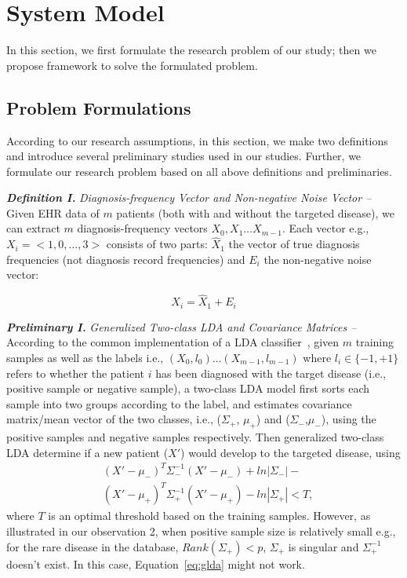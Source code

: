 \section{\TheName{} System Model}\label{sec:3}
In this section, we first formulate the research problem of our study; then we propose \TheName{} framework to solve the formulated problem.

\subsection{Problem Formulations}

According to our research assumptions, in this section, we make two definitions and introduce several preliminary studies used in our studies.
Further, we formulate our research problem based on all above definitions and preliminaries.


\textbf{\em Definition I.} \emph{Diagnosis-frequency Vector and Non-negative Noise Vector -- } Given EHR data of $m$ patients (both with and without the targeted disease), we can extract $m$ diagnosis-frequency vectors $X_0,X_1\dots X_{m-1}$.
Each vector e.g., $X_i=<1,0,\dots,3>$ consists of two parts: $\hat{X}_1$ the vector of true diagnosis frequencies (not diagnosis record frequencies) and $E_i$ the non-negative noise vector: 

\begin{equation}
X_i=\hat{X}_1+E_i
\end{equation}

\textbf{\em Preliminary I.
}\emph{Generalized Two-class LDA and Covariance Matrices -- } According to the common implementation of a LDA classifier~\cite{ziegel2003modern}, given $m$  training samples as well as the labels i.e., $(X_0,l_0)\dots (X_{m-1},l_{m-1})$ where $l_i\in\{-1,+1\}$ refers to whether the patient $i$ has been diagnosed with the target disease (i.e., positive sample or negative sample),  a two-class LDA  model first sorts each sample into two groups according to the label, and estimates covariance matrix/mean vector of the two classes, i.e., ($\Sigma_{+}$, $\mu_+$) and ($\Sigma_{-}$,$\mu_-$), using the positive samples and negative samples respectively.
Then generalized two-class LDA determine if a new patient ($X'$) would develop to the targeted disease, using 
%
\begin{equation}
\begin{aligned}
&(X'-\mu_-)^T\Sigma_{-}^{-1}(X'-\mu_-)+ln|\Sigma_-|-\\
&(X'-\mu_+)^T\Sigma_{+}^{-1}(X'-\mu_+)-ln|\Sigma_+|<T,
\end{aligned}
\label{eq:glda}
\end{equation}
where $T$ is an optimal threshold based on the training samples.
However, as illustrated in our observation 2,  when positive sample size is relatively small e.g., for the rare disease in the database,  $Rank(\Sigma_+)<p$,  $\Sigma_{+}$ is singular and $\Sigma_{+}^{-1}$  doesn't exist.
In this case, Equation~\ref{eq:glda} might not work.



